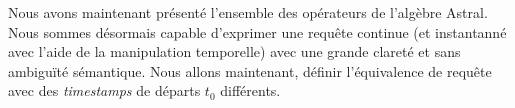 Nous avons maintenant présenté l'ensemble des opérateurs de l'algèbre Astral. Nous sommes désormais capable d'exprimer une requête continue (et instantanné avec l'aide de la manipulation temporelle) avec une grande clareté et sans ambiguïté sémantique. Nous allons maintenant, définir l'équivalence de requête avec des \textit{timestamps} de départs $t_0$ différents.